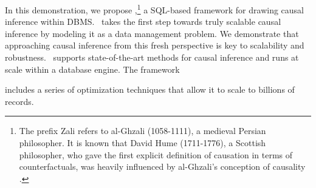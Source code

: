 In this demonstration, we propose \GSQL,\footnote{ The prefix Zali refers to
  al-Ghzali (1058-1111), a medieval Persian philosopher. It is known
  that David Hume (1711-1776), a Scottish philosopher, who gave the
  first explicit definition of causation in terms of counterfactuals,
  was heavily influenced by al-Ghzali's conception of causality
  \cite{shalizi2013advanced}.}
  a SQL-based framework for drawing causal inference within DBMS. \GSQL\ takes the first step towards truly scalable causal inference by modeling it as a data management problem. We demonstrate that
   approaching causal inference from this fresh perspective is key to scalability and robustness.  \GSQL\ supports state-of-the-art methods for causal inference and runs at scale within a database engine.   The framework  includes a series of optimization techniques that allow it to
scale to billions of records.


